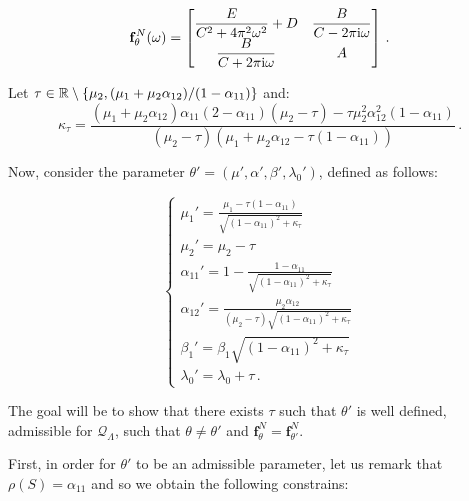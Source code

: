 \begin{subappendices}
\begin{itemize}
\begin{equation}\label{eq:chap4_bi_matrix_constants}
\mathbf{f}_\theta^N(\omega) = 
\begin{bmatrix}
  \dfrac{E}{C^2 + 4 \pi^2 \omega^2} + D & \dfrac{B}{C - 2 \pi \mathrm{i} \omega}\\
  \dfrac{B}{C + 2 \pi \mathrm{i} \omega} & A
\end{bmatrix}\,.
\end{equation}

Let $\tau\in{\mathbb R}\setminus \left\{\mu_2, (\mu_1 + \mu_2 \alpha_{12})/(1-\alpha_{11}) \right\}$ and: \[\kappa_\tau = \frac{(\mu_1 + \mu_2 \alpha_{12})\alpha_{11}(2-\alpha_{11})(\mu_2 - \tau) - \tau\mu_2^2 \alpha_{12}^2(1-\alpha_{11})}{(\mu_2 - \tau)(\mu_1 + \mu_2\alpha_{12} - \tau(1-\alpha_{11}))}\,.\]

Now, consider the parameter $\theta' = (\mu', \alpha', \beta', \lambda_0')$, defined as follows:

\begin{equation}\label{eq:chap4_bi_system_constants}
\begin{cases}
  \mu_1' = \frac{\mu_1 - \tau(1-\alpha_{11})}{\sqrt{(1-\alpha_{11})^2 + \kappa_\tau}}\\
  \mu_2' = \mu_2 - \tau\\
  \alpha_{11}' = 1 - \frac{1-\alpha_{11}}{\sqrt{(1-\alpha_{11})^2 + \kappa_\tau}}\\
  \alpha_{12}' = \frac{\mu_2 \alpha_{12}}{(\mu_2 - \tau)\sqrt{(1-\alpha_{11})^2 + \kappa_\tau}}\\
  \beta_1' = \beta_1 \sqrt{(1-\alpha_{11})^2 + \kappa_\tau}\\
  \lambda_0' = \lambda_0 + \tau\,.
\end{cases}
\end{equation}

The goal will be to show that there exists $\tau$ such that $\theta'$ is well defined, admissible for $\mathcal Q_\Lambda$, such that $\theta\neq\theta'$ and $\mathbf{f}_\theta^N = \mathbf{f}_{\theta'}^N$.

First, in order for $\theta'$ to be an admissible parameter, let us remark that $\rho(S) = \alpha_{11}$ and so we obtain the following constrains:


\end{itemize}
\end{subappendices}
